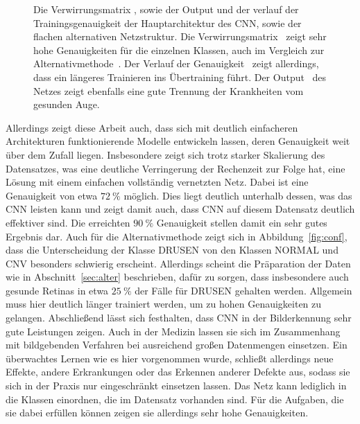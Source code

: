 \begin{figure}[h!]
  \caption{Die Verwirrungsmatrix \protect{}
  \protect{}, sowie der Output \protect{} und
  der verlauf der Trainingsgenauigkeit \protect{} der
  Hauptarchitektur des CNN, sowie der flachen alternativen Netzstruktur. Die
  Verwirrungsmatrix~\protect{} zeigt sehr hohe Genauigkeiten für
  die einzelnen Klassen, auch im Vergleich zur
  Alternativmethode~\protect{}. Der Verlauf der Genauigkeit~\protect{} zeigt allerdings, dass ein längeres Trainieren ins Übertraining führt. Der Output~\protect{} des Netzes zeigt ebenfalls eine gute Trennung der Krankheiten vom gesunden Auge.}
  \label{fig:erg}
\end{figure}
%
\newpage
Allerdings zeigt diese Arbeit auch, dass sich mit deutlich einfacheren
Architekturen funktionierende Modelle entwickeln lassen, deren Genauigkeit weit
über dem Zufall liegen. Insbesondere zeigt sich trotz starker Skalierung des
Datensatzes, was eine deutliche Verringerung der Rechenzeit
zur Folge hat, eine Lösung mit einem einfachen vollständig vernetzten Netz.
Dabei ist eine Genauigkeit von etwa $\SI{72}{\percent}$ möglich. Dies liegt
deutlich unterhalb dessen, was das CNN leisten kann und zeigt damit auch, dass
CNN auf diesem Datensatz deutlich effektiver sind. Die erreichten
$\SI{90}{\percent}$ Genauigkeit stellen damit ein sehr gutes Ergebnis dar.
Auch für die Alternativmethode zeigt sich in Abbildung~\ref{fig:conf}, dass die
Unterscheidung der Klasse DRUSEN von den Klassen NORMAL und CNV besonders
schwierig erscheint. Allerdings scheint die Präparation der Daten wie in
Abschnitt~\ref{sec:alter} beschrieben, dafür zu sorgen, dass insbesondere auch
gesunde Retinas in etwa $\SI{25}{\percent}$ der Fälle für DRUSEN gehalten
werden. Allgemein muss hier deutlich länger trainiert werden, um zu hohen
Genauigkeiten zu gelangen.
Abschließend lässt sich festhalten, dass CNN in der Bilderkennung sehr gute
Leistungen zeigen. Auch in der Medizin lassen sie sich im Zusammenhang mit
bildgebenden Verfahren bei ausreichend großen Datenmengen einsetzen. Ein
überwachtes Lernen wie es hier vorgenommen wurde, schließt allerdings neue
Effekte, andere Erkrankungen oder das Erkennen anderer Defekte aus, sodass sie
sich in der Praxis nur eingeschränkt einsetzen lassen. Das Netz kann lediglich
in die Klassen einordnen, die im Datensatz vorhanden sind. Für die Aufgaben, die
sie dabei erfüllen können zeigen sie allerdings sehr hohe Genauigkeiten.

